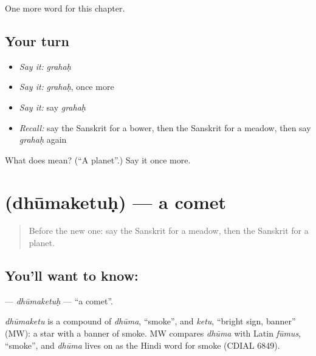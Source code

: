 \begin{grammarlens}[title={What you've built}]
One more word for this chapter.
\end{grammarlens}

\subsection*{Your turn}
\begin{itemize}
\raggedright
  \item \emph{Say it:} \emph{grahaḥ}
  \item \emph{Say it:} \emph{grahaḥ}, once more
  \item \emph{Say it:} say \emph{grahaḥ}
  \item \emph{Recall:} say the Sanskrit for a bower, then the Sanskrit for a meadow, then say \emph{grahaḥ} again
\end{itemize}

\begin{tcolorbox}[breakable,colback=teal!4,colframe=teal!35!black,title={Before you move on}]
What does  mean? (\textquotedblleft{}A planet\textquotedblright{}.) Say it once more.
\end{tcolorbox}
\section[\texorpdfstring{\sk{धूमकेतुः} (dhūmaketuḥ)}{धूमकेतुः (dhūmaketuḥ)}]{ (dhūmaketuḥ) — a comet}

\label{lesson:SA-C226-dhumaketuh}



\begin{quote}
Before the new one: say the Sanskrit for a meadow, then the Sanskrit for a planet.
\end{quote}

\subsection*{You'll want to know: }
\textbf{} — \emph{dhūmaketuḥ} — \textquotedblleft{}a comet\textquotedblright{}.

\begin{cousinweb}
\emph{dhūmaketu} is a compound of \emph{dhūma}, \textquotedblleft{}smoke\textquotedblright{}, and \emph{ketu}, \textquotedblleft{}bright sign, banner\textquotedblright{} (MW): a star with a banner of smoke. MW compares \emph{dhūma} with Latin \emph{fūmus}, \textquotedblleft{}smoke\textquotedblright{}, and \emph{dhūma} lives on as the Hindi word for smoke (CDIAL 6849).
\end{cousinweb}

